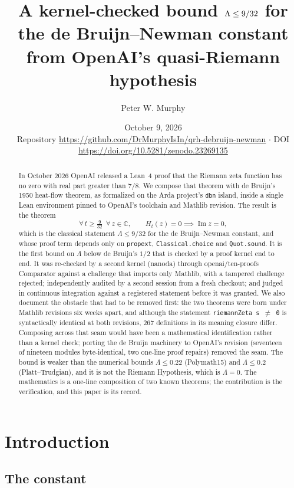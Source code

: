 \documentclass[11pt]{article}
\title{A kernel-checked bound $\Lam \le 9/32$ for the de Bruijn--Newman constant\\
from OpenAI's quasi-Riemann hypothesis}
\author{Peter W. Murphy}
\date{October 9, 2026\\[2pt] \small Repository \url{https://github.com/DrMurphyIsIn/qrh-debruijn-newman} \;$\cdot$\; DOI \url{https://doi.org/10.5281/zenodo.23269135}}
\theoremstyle{definition}
\newcommand{\lean}[1]{\texttt{#1}}
\newcommand{\Lam}{\Lambda}
\newcommand{\Hfun}{H}
\newcommand{\im}{\operatorname{Im}}
\newcommand{\C}{\mathbb{C}}
\begin{document}
\maketitle

\begin{abstract}
In October 2026 OpenAI released a Lean~4 proof that the Riemann zeta function has no zero with real part greater than $7/8$. We compose that theorem with de Bruijn's 1950 heat-flow theorem, as formalized on the Arda project's \lean{dbn} island, inside a single Lean environment pinned to OpenAI's toolchain and Mathlib revision. The result is the theorem
\[
\forall\, t \ge \tfrac{9}{32}\ \ \forall\, z \in \C,\qquad \Hfun_t(z) = 0 \implies \im z = 0,
\]
which is the classical statement $\Lam \le 9/32$ for the de Bruijn--Newman constant, and whose proof term depends only on \lean{propext}, \lean{Classical.choice} and \lean{Quot.sound}. It is the first bound on $\Lam$ below de Bruijn's $1/2$ that is checked by a proof kernel end to end. It was re-checked by a second kernel (nanoda) through openai/ten-proofs Comparator against a challenge that imports only Mathlib, with a tampered challenge rejected; independently audited by a second session from a fresh checkout; and judged in continuous integration against a registered statement before it was granted. We also document the obstacle that had to be removed first: the two theorems were born under Mathlib revisions six weeks apart, and although the statement \lean{riemannZeta s $\neq$ 0} is syntactically identical at both revisions, 267 definitions in its meaning closure differ. Composing across that seam would have been a mathematical identification rather than a kernel check; porting the de Bruijn machinery to OpenAI's revision (seventeen of nineteen modules byte-identical, two one-line proof repairs) removed the seam. The bound is weaker than the numerical bounds $\Lam \le 0.22$ (Polymath15) and $\Lam \le 0.2$ (Platt--Trudgian), and it is not the Riemann Hypothesis, which is $\Lam = 0$. The mathematics is a one-line composition of two known theorems; the contribution is the verification, and this paper is its record.
\end{abstract}

\section{Introduction}

\subsection{The constant}
\end{document}
